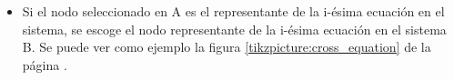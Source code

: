 \begin{itemize}
    \item Si el nodo seleccionado en A es el representante de la i-ésima ecuación en el sistema, se escoge el nodo representante de la i-ésima ecuación en el sistema B. Se puede ver como ejemplo la figura \ref{tikzpicture:cross_equation} de la página \pageref{tikzpicture:cross_equation}.

          \begin{center}




\end{center}
\end{itemize}

